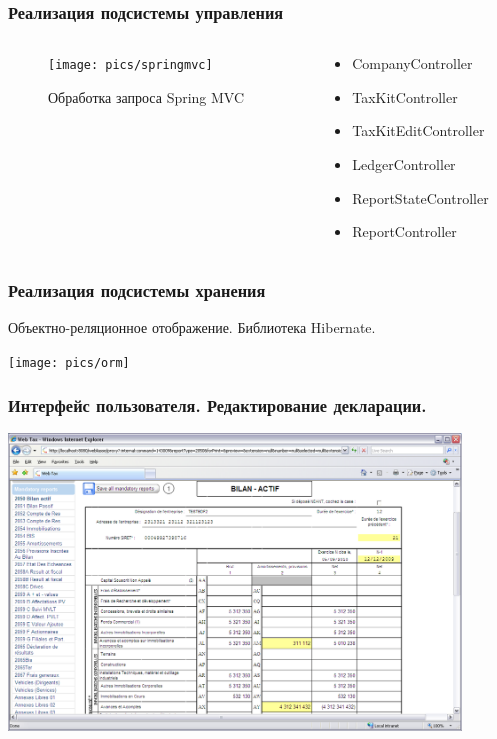 \documentclass[xcolor=pdftex, dvipsnames, table]{beamer}
\begin{document}
\begin{frame}
  \frametitle{Реализация подсистемы управления}
  \begin{columns}
    \begin{column}{0.6\textwidth}
      \begin{center}
        \begin{figure}
          \texttt{[image: pics/springmvc]}
          \caption{Обработка запроса Spring MVC}
          \label{pic:springmvc}
        \end{figure}
      \end{center}
    \end{column}
    \begin{column}{0.5\textwidth}
      \begin{itemize}
        \item CompanyController
        \item TaxKitController
        \item TaxKitEditController
        \item LedgerController
        \item ReportStateController
        \item ReportController
      \end{itemize}
    \end{column}
  \end{columns}
\end{frame}

\begin{frame}
  \frametitle{Реализация подсистемы хранения}
  Объектно-реляционное отображение. Библиотека Hibernate.
  \begin{center}
    \texttt{[image: pics/orm]}
  \end{center}
\end{frame}

\begin{frame}
  \frametitle{Интерфейс пользователя. Редактирование декларации.}
  \begin{center}
    \includegraphics[width=0.9\textwidth]{pics/src_reportnice}
  \end{center}
\end{frame}
\end{document}

